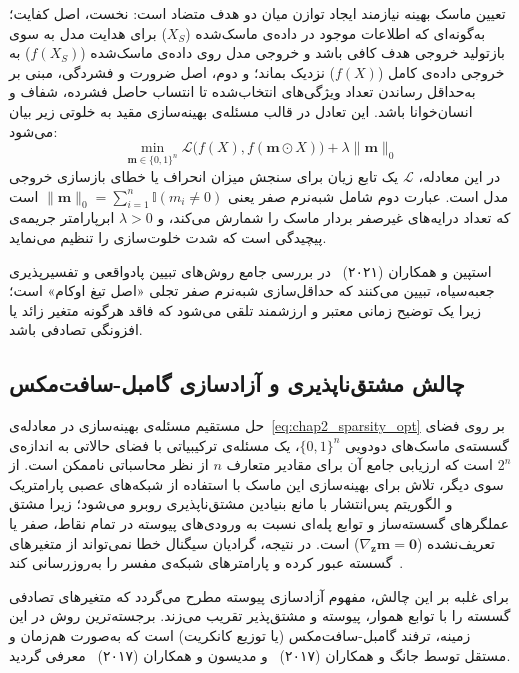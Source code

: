 تعیین ماسک بهینه نیازمند ایجاد توازن میان دو هدف متضاد است: نخست، اصل کفایت؛ به‌گونه‌ای که اطلاعات موجود در داده‌ی ماسک‌شده ($X_S$) برای هدایت مدل به سوی بازتولید خروجی هدف کافی باشد و خروجی مدل روی داده‌ی ماسک‌شده ($f(X_S)$) به خروجی داده‌ی کامل ($f(X)$) نزدیک بماند؛ و دوم، اصل ضرورت و فشردگی، مبنی بر به‌حداقل رساندن تعداد ویژگی‌های انتخاب‌شده تا انتساب حاصل فشرده، شفاف و انسان‌خوانا باشد. این تعادل در قالب مسئله‌ی بهینه‌سازی مقید به خلوتی زیر بیان می‌شود:
\begin{equation}\label{eq:chap2_sparsity_opt}
    \min_{\mathbf{m} \in {\{0, 1\}}^n} \mathcal{L}\big(f(X), f(\mathbf{m} \odot X)\big) + \lambda \|\mathbf{m}\|_0
\end{equation}
در این معادله، $\mathcal{L}$ یک تابع زیان برای سنجش میزان انحراف یا خطای بازسازی خروجی مدل است. عبارت دوم شامل شبه‌نرم صفر یعنی $\|\mathbf{m}\|_0 = \sum_{i=1}^n \mathbb{I}(m_i \neq 0)$ است که تعداد درایه‌های غیرصفر بردار ماسک را شمارش می‌کند، و $\lambda > 0$ ابرپارامتر جریمه‌ی پیچیدگی است که شدت خلوت‌سازی را تنظیم می‌نماید.

استپین و همکاران (۲۰۲۱)~\cite{stepin2021survey} در بررسی جامع روش‌های تبیین پادواقعی و تفسیرپذیری جعبه‌سیاه، تبیین می‌کنند که حداقل‌سازی شبه‌نرم صفر تجلی «اصل تیغ اوکام» است؛ زیرا یک توضیح زمانی معتبر و ارزشمند تلقی می‌شود که فاقد هرگونه متغیر زائد یا افزونگی تصادفی باشد.


\subsection{چالش مشتق‌ناپذیری و آزادسازی گامبل-سافت‌مکس}\label{sec:2-5-3}

حل مستقیم مسئله‌ی بهینه‌سازی در معادله‌ی~\ref{eq:chap2_sparsity_opt} بر روی فضای گسسته‌ی ماسک‌های دودویی ${\{0, 1\}}^n$، یک مسئله‌ی ترکیبیاتی با فضای حالاتی به اندازه‌ی $2^n$ است که ارزیابی جامع آن برای مقادیر متعارف $n$ از نظر محاسباتی ناممکن است. از سوی دیگر، تلاش برای بهینه‌سازی این ماسک با استفاده از شبکه‌های عصبی پارامتریک و الگوریتم پس‌انتشار با مانع بنیادین مشتق‌ناپذیری روبرو می‌شود؛ زیرا مشتق عملگرهای گسسته‌ساز و توابع پله‌ای نسبت به ورودی‌های پیوسته در تمام نقاط، صفر یا تعریف‌نشده ($\nabla_{\mathbf{z}} \mathbf{m} = \mathbf{0}$) است. در نتیجه، گرادیان سیگنال خطا نمی‌تواند از متغیرهای گسسته عبور کرده و پارامترهای شبکه‌ی مفسر را به‌روزرسانی کند~\cite{chen2018learning}.

برای غلبه بر این چالش، مفهوم آزادسازی پیوسته مطرح می‌گردد که متغیرهای تصادفی گسسته را با توابع هموار، پیوسته و مشتق‌پذیر تقریب می‌زند. برجسته‌ترین روش در این زمینه، ترفند گامبل-سافت‌مکس (یا توزیع کانکریت) است که به‌صورت هم‌زمان و مستقل توسط جانگ و همکاران (۲۰۱۷)~\cite{jang2017categorical} و مدیسون و همکاران (۲۰۱۷)~\cite{maddison2017concrete} معرفی گردید.

